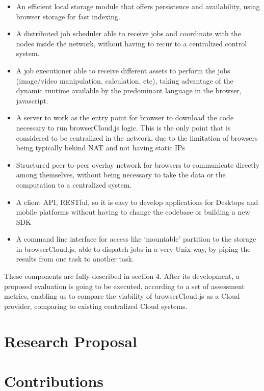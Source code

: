 \begin{itemize}
  \item An efficient local storage module that offers persistence and availability, using browser storage for fast indexing.
  \item A distributed job scheduler able to receive jobs and coordinate with the nodes inside the network, without having to recur to a centralized control system.
  \item A job executioner able to receive different assets to perform the jobs (image/video manipulation, calculation, etc), taking advantage of the dynamic runtime available by the predominant language in the browser, javascript.
  \item A server to work as the entry point for browser to download the code necessary to run browserCloud.js logic. This is the only point that is considered to be centralized in the network, due to the limitation of browsers being typically behind NAT and not having static IPs
  \item Structured peer-to-peer overlay network for browsers to communicate directly among themselves, without being necessary to take the data or the computation to a centralized system.
  \item A client API, RESTful, so it is easy to develop applications for Desktops and mobile platforms without having to change the codebase or building a new SDK
  \item A command line interface for access like `mountable' partition to the storage in browserCloud.js, able to dispatch jobs in a very Unix way, by piping the results from one task to another task.
 
\end{itemize}

These components are fully described in section 4. After its development, a proposed evaluation is going to be executed, according to a set of assessment metrics, enabling us to compare the viability of browserCloud.js as a Cloud provider, comparing to existing centralized Cloud systems.

\section{Research Proposal}

\section{Contributions}

